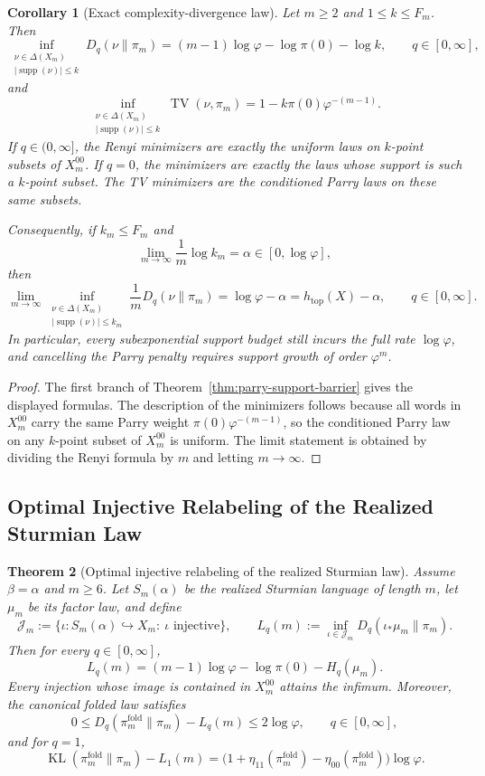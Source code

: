 \documentclass[11pt,letterpaper]{article}
\numberwithin{equation}{section}
\theoremstyle{plain}
\newtheorem{theorem}{Theorem}[section]
\newtheorem{corollary}[theorem]{Corollary}
\theoremstyle{definition}
\theoremstyle{remark}
\DeclareMathOperator{\TV}{TV}
\DeclareMathOperator{\KL}{KL}
\DeclareMathOperator{\supp}{supp}
\begin{document}
\begin{corollary}[Exact complexity-divergence law]\label{cor:exact-complexity-divergence-law}
Let \(m\ge 2\) and \(1\le k\le F_m\). Then
\[
\inf_{\substack{\nu\in\Delta(X_m)\\ |\supp(\nu)|\le k}}D_q(\nu\|\pi_m)
=
(m-1)\log\varphi-\log\pi(0)-\log k,
\qquad q\in[0,\infty],
\]
and
\[
\inf_{\substack{\nu\in\Delta(X_m)\\ |\supp(\nu)|\le k}}\TV(\nu,\pi_m)
=
1-k\pi(0)\varphi^{-(m-1)}.
\]
If \(q\in(0,\infty]\), the Renyi minimizers are exactly the uniform laws on
\(k\)-point subsets of \(X_m^{00}\). If \(q=0\), the minimizers are exactly the
laws whose support is such a \(k\)-point subset. The TV minimizers are the
conditioned Parry laws on these same subsets.

Consequently, if \(k_m\le F_m\) and
\[
\lim_{m\to\infty}\frac{1}{m}\log k_m=\alpha\in[0,\log\varphi],
\]
then
\[
\lim_{m\to\infty}
\inf_{\substack{\nu\in\Delta(X_m)\\ |\supp(\nu)|\le k_m}}
\frac{1}{m}D_q(\nu\|\pi_m)
=
\log\varphi-\alpha
=
h_{\mathrm{top}}(X)-\alpha,
\qquad q\in[0,\infty].
\]
In particular, every subexponential support budget still incurs the full rate
\(\log\varphi\), and cancelling the Parry penalty requires support growth of
order \(\varphi^m\).
\end{corollary}

\begin{proof}
The first branch of Theorem~\ref{thm:parry-support-barrier} gives the displayed
formulas. The description of the minimizers follows because all words in
\(X_m^{00}\) carry the same Parry weight \(\pi(0)\varphi^{-(m-1)}\), so the
conditioned Parry law on any \(k\)-point subset of \(X_m^{00}\) is uniform.
The limit statement is obtained by dividing the Renyi formula by \(m\) and
letting \(m\to\infty\).
\end{proof}

\subsection{Optimal Injective Relabeling of the Realized Sturmian Law}

\begin{theorem}[Optimal injective relabeling of the realized Sturmian law]
\label{thm:optimal-injective-relabeling}
Assume \(\beta=\alpha\) and \(m\ge 6\). Let \(S_m(\alpha)\) be the realized
Sturmian language of length \(m\), let \(\mu_m\) be its factor law, and define
\[
\mathcal J_m
:=
\{\iota:S_m(\alpha)\hookrightarrow X_m:\ \iota\text{ injective}\},
\qquad
L_q(m)
:=
\inf_{\iota\in\mathcal J_m}D_q(\iota_*\mu_m\|\pi_m).
\]
Then for every \(q\in[0,\infty]\),
\[
L_q(m)
=
(m-1)\log\varphi-\log\pi(0)-H_q(\mu_m).
\]
Every injection whose image is contained in \(X_m^{00}\) attains the infimum.
Moreover, the canonical folded law satisfies
\[
0\le D_q(\pi_m^{\mathrm{fold}}\|\pi_m)-L_q(m)\le 2\log\varphi,
\qquad q\in[0,\infty],
\]
and for \(q=1\),
\[
\KL(\pi_m^{\mathrm{fold}}\|\pi_m)-L_1(m)
=
\bigl(1+\eta_{11}(\pi_m^{\mathrm{fold}})
-\eta_{00}(\pi_m^{\mathrm{fold}})\bigr)\log\varphi.
\]
\end{theorem}
\end{document}
